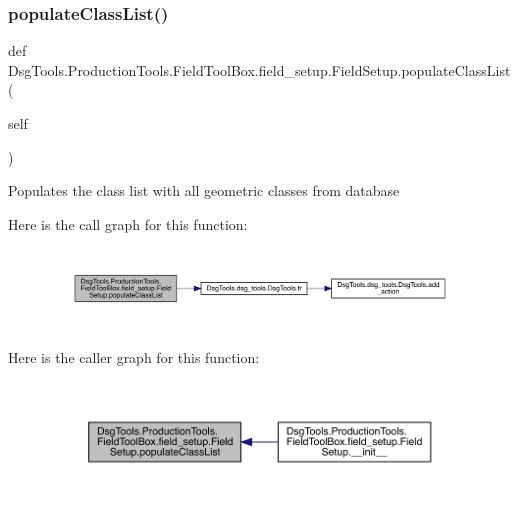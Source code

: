 \subsubsection{\texorpdfstring{populate\+Class\+List()}{populateClassList()}}
{\footnotesize\ttfamily def Dsg\+Tools.\+Production\+Tools.\+Field\+Tool\+Box.\+field\+\_\+setup.\+Field\+Setup.\+populate\+Class\+List (\begin{DoxyParamCaption}\item[{}]{self }\end{DoxyParamCaption})}

\begin{DoxyVerb}Populates the class list with all geometric classes from database
\end{DoxyVerb}
 Here is the call graph for this function\+:
\nopagebreak
\begin{figure}[H]
\begin{center}
\leavevmode
\includegraphics[width=350pt]{class_dsg_tools_1_1_production_tools_1_1_field_tool_box_1_1field__setup_1_1_field_setup_a3f4f3e1bb22836cfb817c95336854602_cgraph}
\end{center}
\end{figure}
Here is the caller graph for this function\+:
\nopagebreak
\begin{figure}[H]
\begin{center}
\leavevmode
\includegraphics[width=350pt]{class_dsg_tools_1_1_production_tools_1_1_field_tool_box_1_1field__setup_1_1_field_setup_a3f4f3e1bb22836cfb817c95336854602_icgraph}
\end{center}
\end{figure}
\mbox{\label{class_dsg_tools_1_1_production_tools_1_1_field_tool_box_1_1field__setup_1_1_field_setup_a57af62e03b1d40b564674204a34285d7}} 
